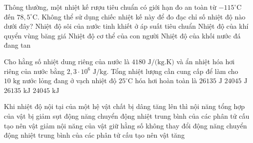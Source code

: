\begin{ex}	Thông thường, một nhiệt kế rượu tiêu chuẩn có giới hạn đo an toàn từ $-115^\circ\text{C}$ đến $78,5^\circ\text{C}$. Không thể sử dụng chiếc nhiệt kế này để đo đạc chỉ số nhiệt độ nào dưới đây?
	\choice
	{\True Nhiệt độ sôi của nước tinh khiết ở áp suất tiêu chuẩn}
	{Nhiệt độ của khí quyển vùng băng giá}
	{Nhiệt độ cơ thể của con người}
	{Nhiệt độ của khối nước đá đang tan}
\end{ex}

\begin{ex}	Cho hằng số nhiệt dung riêng của nước là $4180\text{ J/(kg.K)}$ và ẩn nhiệt hóa hơi riêng của nước bằng $2,3 \cdot 10^6\text{ J/kg}$. Tổng nhiệt lượng cần cung cấp để làm cho $10\text{ kg}$ nước lỏng đang ở vạch nhiệt độ $25^\circ\text{C}$ hóa hơi hoàn toàn là
	\choice
	{$26135\text{ J}$}
	{$24045\text{ J}$}
	{\True $26135\text{ kJ}$}
	{$24045\text{ kJ}$}
\end{ex}

\begin{ex}	Khi nhiệt độ nội tại của một hệ vật chất bị dâng tăng lên thì
	\choice
	{nội năng tổng hợp của vật bị giảm sụt}
	{động năng chuyển động nhiệt trung bình của các phân tử cấu tạo nên vật giảm}
	{nội năng của vật giữ hằng số không thay đổi}
	{\True động năng chuyển động nhiệt trung bình của các phân tử cấu tạo nên vật tăng}
\end{ex}


